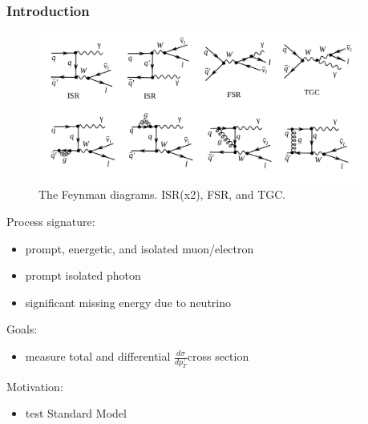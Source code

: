 


\begin{frame}\frametitle{Introduction}
\scriptsize
\begin{figure}[htb]
\begin{center}
\scriptsize
\includegraphics[width=0.95\textwidth]{../figs/WgAbout/feynmWg_LO_NLO.png}
\caption{\scriptsize{The Feynman diagrams. ISR(x2), FSR, and TGC.}}
\end{center}
\end{figure}
\scriptsize
Process signature:\\
\begin{itemize}
\item prompt, energetic, and isolated muon/electron
\item prompt isolated photon
\item significant missing energy due to neutrino 
\end{itemize}
Goals:\\
\begin{itemize}
\item measure total and differential $\frac{d\sigma}{dp_{T}^{\gamma}}$cross section
\end{itemize}
Motivation:\\
\begin{itemize}
\item test Standard Model
\end{itemize}
\end{frame}%

